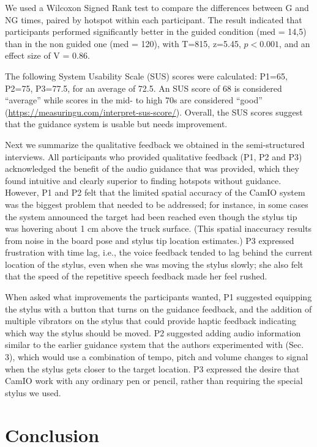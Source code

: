 \documentclass[runningheads]{res/templates/llncs}
\begin{document}
We used a Wilcoxon Signed Rank test to compare the differences between G and NG times, paired by hotspot within each participant. The result indicated that participants performed significantly better in the guided condition (med = 14,5) than in the non guided one (med = 120), with T=815, z=5.45, $p < 0.001$, and an effect size of V = 0.86.

The following System Usability Scale (SUS) scores were calculated: P1=65, P2=75, P3=77.5, for an average of 72.5. 
An SUS score of 68 is considered ``average'' while scores in the mid- to high 70s are considered ``good'' (\url{https://measuringu.com/interpret-sus-score/}).
Overall, the SUS scores suggest that the guidance system is usable but needs improvement.

Next we summarize the qualitative feedback we obtained in the semi-structured interviews. 
All participants who provided qualitative feedback (P1, P2 and P3) acknowledged the benefit of the audio guidance that was provided, which they found intuitive and clearly superior to finding hotspots without guidance. However, P1 and P2 felt that the limited spatial accuracy of the CamIO system was the biggest problem that needed to be addressed; for instance, in some cases the system announced the target had been reached even though the stylus tip was hovering about 1 cm above the truck surface. (This spatial inaccuracy
results from noise in the board pose and stylus tip location estimates.)
P3 expressed frustration with time lag, i.e., the voice feedback tended to lag behind the current location of the stylus, even when she was moving the stylus slowly; she also felt that the speed of the repetitive speech feedback made her feel rushed.

When asked what improvements the participants wanted, P1 suggested
equipping the stylus with a button that turns on the guidance feedback, and the addition of multiple vibrators on the stylus that could provide haptic feedback indicating which way the stylus should be moved. 
P2 suggested adding audio information similar to the earlier guidance system that the authors experimented with (Sec. 3), which would use a combination of tempo, pitch and volume changes to signal when the stylus gets closer to the target location. 
P3 expressed the desire that CamIO work with any ordinary pen or pencil, rather than requiring the special stylus we used.

\hypertarget{conclusion}{%
\section{Conclusion}\label{conclusion}}
\end{document}
